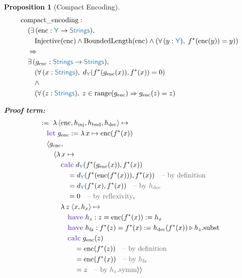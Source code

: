 \documentclass[11pt]{article}
\theoremstyle{definition}
\theoremstyle{plain}
\newtheorem{propenv}{Proposition}
\newcommand{\kw}[1]{\textcolor{keyword}{\textbf{#1}}}
\newcommand{\ty}[1]{\textcolor{type}{\mathsf{#1}}}
\newcommand{\fn}[1]{\mathrm{#1}}
\newcommand{\cmt}[1]{\textcolor{comment}{\text{-- #1}}}
\newcommand{\lam}{\lambda\,}
\newcommand{\all}{\forall\,}
\newcommand{\ex}{\exists\,}
\newcommand{\arr}{\to}
\newcommand{\Arr}{\Rightarrow}
\newcommand{\pf}{:=\;}
\newcommand{\Strings}{\ty{Strings}}
\newcommand{\Y}{\ty{Y}}
\newcommand{\fstar}{f^*}
\newcommand{\dY}{d_{\Y}}
\begin{document}
\begin{propenv}[Compact Encoding]
\label{prop:encoding}
\begin{align*}
&\fn{compact\_encoding} : \\
&\quad (\ex (\fn{enc} : \Y \arr \Strings), \\
&\quad\quad \fn{Injective}(\fn{enc}) \land \fn{BoundedLength}(\fn{enc}) \land (\all (y : \Y),\; \fstar(\fn{enc}(y)) = y)) \\
&\quad \Arr \\
&\quad \ex (g_{\text{enc}} : \Strings \arr \Strings), \\
&\quad\quad (\all (x : \Strings),\; \dY(\fstar(g_{\text{enc}}(x)), \fstar(x)) = 0) \\
&\quad\quad \land \\
&\quad\quad (\all (z : \Strings),\; z \in \fn{range}(g_{\text{enc}}) \Arr g_{\text{enc}}(z) = z)
\end{align*}

\textbf{Proof term:}
\begin{align*}
&\pf \lam \langle \fn{enc}, h_{\text{inj}}, h_{\text{bnd}}, h_{\text{dec}} \rangle \mapsto \\
&\quad \kw{let}\; g_{\text{enc}} := \lam x \mapsto \fn{enc}(\fstar(x)) \\
&\quad \langle g_{\text{enc}}, \\
&\quad\quad \langle \lam x \mapsto \\
&\quad\quad\quad \kw{calc}\; \dY(\fstar(g_{\text{enc}}(x)), \fstar(x)) \\
&\quad\quad\quad\quad = \dY(\fstar(\fn{enc}(\fstar(x))), \fstar(x)) \quad\cmt{by definition} \\
&\quad\quad\quad\quad = \dY(\fstar(x), \fstar(x)) \quad\cmt{by $h_{\text{dec}}$} \\
&\quad\quad\quad\quad = 0 \quad\cmt{by reflexivity}, \\
&\quad\quad\quad \lam z\; \langle x, h_x \rangle \mapsto \\
&\quad\quad\quad\quad \kw{have}\; h_z : z = \fn{enc}(\fstar(x)) := h_x \\
&\quad\quad\quad\quad \kw{have}\; h_{\text{fz}} : \fstar(z) = \fstar(x) := h_{\text{dec}}(\fstar(x)) \triangleright h_z.\fn{subst} \\
&\quad\quad\quad\quad \kw{calc}\; g_{\text{enc}}(z) \\
&\quad\quad\quad\quad\quad = \fn{enc}(\fstar(z)) \quad\cmt{by definition} \\
&\quad\quad\quad\quad\quad = \fn{enc}(\fstar(x)) \quad\cmt{by $h_{\text{fz}}$} \\
&\quad\quad\quad\quad\quad = z \quad\cmt{by $h_z.\fn{symm}$} \rangle \rangle
\end{align*}
\end{propenv}
\end{document}
